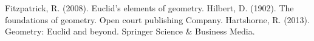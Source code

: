 \documentclass[main]{subfiles}
\begin{document}
	{\small
		\begin{thebibliography}{9}
			 Fitzpatrick, R. (2008). Euclid's elements of geometry.
			 Hilbert, D. (1902). The foundations of geometry. Open court publishing Company.
			 Hartshorne, R. (2013). Geometry: Euclid and beyond. Springer Science \& Business Media.
		\end{thebibliography}
	}
\end{document}
